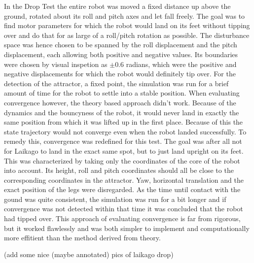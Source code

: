     In the Drop Test the entire robot was moved a fixed distance up above the ground, rotated about its roll and pitch axes and let fall freely. The goal was to find motor parameters for which the robot would land on its feet without tipping over and do that for as large of a roll/pitch rotation as possible. The disturbance space was hence chosen to be spanned by the roll displacement and the pitch displacement, each allowing both positive and negative values. Its boundaries were chosen by visual inspetion as $\pm 0.6$ radians, which were the positive and negative displacements for which the robot would definitely tip over. For the detection of the attractor, a fixed point, the simulation was run for a brief amount of time for the robot to settle into a stable position. When evaluating convergence however, the theory based approach didn't work. Because of the dynamics and the bouncyness of the robot, it would never land in exactly the same position from which it was lifted up in the first place. Because of this the state trajectory would not converge even when the robot landed successfully. To remedy this, convergence was redefined for this test. The goal was after all not for Laikago to land in the exact same spot, but to just land upright on its feet. This was characterized by taking only the coordinates of the core of the robot into account. Its height, roll and pitch coordinates should all be close to the corresponding coordinates in the attractor. Yaw, horizontal translation and the exact position of the legs were disregarded.
    As the time until contact with the gound was quite consistent, the simulation was run for a bit longer and if convergence was not detected within that time it was concluded that the robot had tipped over. This approach of evaluating convergence is far from rigorous, but it worked flawlessly and was both simpler to implement and computationally more effitient than the method derived from theory. 

    (add some nice (maybe annotated) pics of laikago drop)


